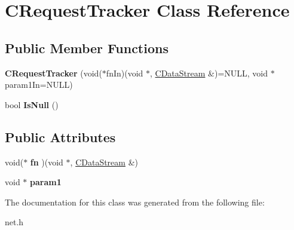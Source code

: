 \hypertarget{class_c_request_tracker}{}\section{C\+Request\+Tracker Class Reference}
\label{class_c_request_tracker}
\subsection*{Public Member Functions}
\begin{DoxyCompactItemize}
\item 
\mbox{\label{class_c_request_tracker_a1e3f5ecc08281ceb507107508945acd2}} 
{\bfseries C\+Request\+Tracker} (void($\ast$fn\+In)(void $\ast$, \mbox{\hyperlink{class_c_data_stream}{C\+Data\+Stream}} \&)=N\+U\+LL, void $\ast$param1\+In=N\+U\+LL)
\item 
\mbox{\label{class_c_request_tracker_a9b80a11ea197fc5e255002ed252114d0}} 
bool {\bfseries Is\+Null} ()
\end{DoxyCompactItemize}
\subsection*{Public Attributes}
\begin{DoxyCompactItemize}
\item 
\mbox{\label{class_c_request_tracker_ad44708ddc7a0b49d4cdd8624b253c17b}} 
void($\ast$ {\bfseries fn} )(void $\ast$, \mbox{\hyperlink{class_c_data_stream}{C\+Data\+Stream}} \&)
\item 
\mbox{\label{class_c_request_tracker_a3758b3f19150feaa78017d6d38d5d9e5}} 
void $\ast$ {\bfseries param1}
\end{DoxyCompactItemize}


The documentation for this class was generated from the following file\+:\begin{DoxyCompactItemize}
\item 
net.\+h\end{DoxyCompactItemize}
